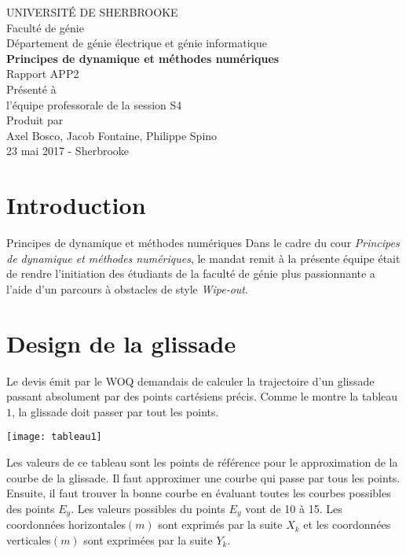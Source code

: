 \documentclass[12pt]{article}
\begin{document}
\begin{titlepage} 
	\large
	{
		\begin{center}
			UNIVERSITÉ DE SHERBROOKE\\Faculté de génie\\
			Département de génie électrique et génie informatique\\
			\vspace{3cm}
			{\LARGE\textbf{Principes de dynamique et méthodes numériques}}\\
			\vspace{2cm}
			\LARGE{Rapport APP2}\\
			\vspace{2cm}
			Présenté à\\l'équipe professorale de la session S4\\
			\vspace{2cm}
			Produit par\\Axel Bosco, Jacob Fontaine, Philippe Spino\\
			\vspace{1cm}
			\vfill{23 mai 2017 - Sherbrooke}
		\end{center}
	}
\end{titlepage}
\tableofcontents
\newpage
\section{Introduction}
Principes de dynamique et méthodes numériques
Dans le cadre du cour \textit{Principes de dynamique et méthodes numériques}, le mandat remit à la présente équipe était de rendre l'initiation des étudiants de la faculté de génie plus passionnante a l'aide d'un parcours à obstacles de style \textit{Wipe-out}.

\section{Design de la glissade}
Le devis émit par le WOQ demandais de calculer la trajectoire d'un glissade passant absolument par des points cartésiens précis. Comme le montre la tableau $1$, la glissade doit passer par tout les points.

\begin{center}
	\texttt{[image: tableau1]}
\end{center}
Les valeurs de ce tableau sont les points de référence pour le approximation de la courbe de la glissade. Il faut approximer une courbe qui passe par tous les points. Ensuite, il faut trouver la bonne courbe en évaluant toutes les courbes possibles des points $E_y$. Les valeurs possibles du points $E_y$ vont de 10 à 15. Les coordonnées horizontales$(m)$ sont exprimés par la suite $X_k$ et les coordonnées verticales$(m)$ sont exprimées par la suite $Y_k$. 
\end{document}
